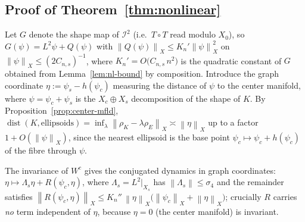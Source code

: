\documentclass[11pt,reqno]{amsart}
\theoremstyle{plain}
\theoremstyle{definition}
\newcommand{\IB}{\mathcal{I}}
\newcommand{\norm}[1]{\left\lVert #1 \right\rVert}
\DeclareMathOperator{\dist}{dist}
\begin{document}
\subsection{Proof of Theorem~\ref{thm:nonlinear}}
Let $G$ denote the shape map of $\IB^2$ (i.e.\ $T\circ T$ read modulo $X_0$),
so $G(\psi)=L^2\psi+Q(\psi)$ with $\norm{Q(\psi)}_X\le K_n'\norm\psi_X^2$ on
$\norm\psi_X\le(2C_{n,s})^{-1}$, where $K_n'=O\big(C_{n,s}\,n^2\big)$ is the
quadratic constant of $G$ obtained from Lemma~\ref{lem:nl-bound} by composition.
Introduce the graph coordinate $\eta:=\psi_s-h(\psi_c)$ measuring the distance
of $\psi$ to the center manifold, where $\psi=\psi_c+\psi_s$ is the
$X_c\oplus X_s$ decomposition of the shape of $K$. By
Proposition~\ref{prop:center-mfld}, $\dist(K,\text{ellipsoids})
=\inf_{\lambda}\norm{\rho_K-\lambda\rho_E}_X\asymp\norm\eta_X$ up to a factor
$1+O(\norm\psi_X)$, since the nearest ellipsoid is the base point
$\psi_c\mapsto\psi_c+h(\psi_c)$ of the fibre through $\psi$.

The invariance of $W^c$ gives the conjugated dynamics in graph coordinates:
$\eta\mapsto \Lambda_s\eta + R(\psi_c,\eta)$, where $\Lambda_s=L^2|_{X_s}$ has
$\norm{\Lambda_s}\le\sigma_4$ and the remainder satisfies
$\norm{R(\psi_c,\eta)}_X\le K_n''\,\norm\eta_X\big(\norm{\psi_c}_X
+\norm\eta_X\big)$; crucially $R$ carries \emph{no} term independent of $\eta$,
because $\eta=0$ (the center manifold) is invariant.
\end{document}
